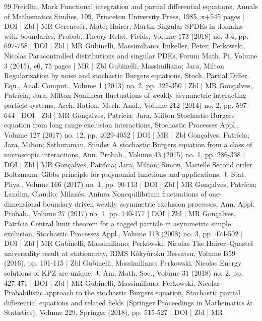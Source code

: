 \begin{thebibliography}{99}
Freidlin, Mark Functional integration and partial differential equations, Annals of Mathematics Studies, 109, Princeton University Press, 1985, x+545 pages | DOI | Zbl | MR
Gerencsér, Máté; Hairer, Martin Singular SPDEs in domains with boundaries, Probab. Theory Relat. Fields, Volume 173 (2018) no. 3-4, pp. 697-758 | DOI | Zbl | MR
Gubinelli, Massimiliano; Imkeller, Peter; Perkowski, Nicolas Paracontrolled distributions and singular PDEs, Forum Math. Pi, Volume 3 (2015), e6, 75 pages | MR | Zbl
Gubinelli, Massimiliano; Jara, Milton Regularization by noise and stochastic Burgers equations, Stoch. Partial Differ. Equ., Anal. Comput., Volume 1 (2013) no. 2, pp. 325-350 | Zbl | MR
Gonçalves, Patrícia; Jara, Milton Nonlinear fluctuations of weakly asymmetric interacting particle systems, Arch. Ration. Mech. Anal., Volume 212 (2014) no. 2, pp. 597-644 | DOI | Zbl | MR
Gonçalves, Patrícia; Jara, Milton Stochastic Burgers equation from long range exclusion interactions, Stochastic Processes Appl., Volume 127 (2017) no. 12, pp. 4029-4052 | DOI | MR | Zbl
Gonçalves, Patrícia; Jara, Milton; Sethuraman, Sunder A stochastic Burgers equation from a class of microscopic interactions, Ann. Probab., Volume 43 (2015) no. 1, pp. 286-338 | DOI | Zbl | MR
Gonçalves, Patrícia; Jara, Milton; Simon, Marielle Second order Boltzmann–Gibbs principle for polynomial functions and applications, J. Stat. Phys., Volume 166 (2017) no. 1, pp. 90-113 | DOI | Zbl | MR
Gonçalves, Patrícia; Landim, Claudio; Milanés, Aniura Nonequilibrium fluctuations of one-dimensional boundary driven weakly asymmetric exclusion processes, Ann. Appl. Probab., Volume 27 (2017) no. 1, pp. 140-177 | DOI | Zbl | MR
Gonçalves, Patrícia Central limit theorem for a tagged particle in asymmetric simple exclusion, Stochastic Processes Appl., Volume 118 (2008) no. 3, pp. 474-502 | DOI | Zbl | MR
Gubinelli, Massimiliano; Perkowski, Nicolas The Hairer–Quastel universality result at stationarity, RIMS Kôkyûroku Bessatsu, Volume B59 (2016), pp. 101-115 | Zbl
Gubinelli, Massimiliano; Perkowski, Nicolas Energy solutions of KPZ are unique, J. Am. Math. Soc., Volume 31 (2018) no. 2, pp. 427-471 | DOI | Zbl | MR
Gubinelli, Massimiliano; Perkowski, Nicolas Probabilistic approach to the stochastic Burgers equation, Stochastic partial differential equations and related fields (Springer Proceedings in Mathematics \& Statistics), Volume 229, Springer (2018), pp. 515-527 | DOI | Zbl | MR

\end{thebibliography}
